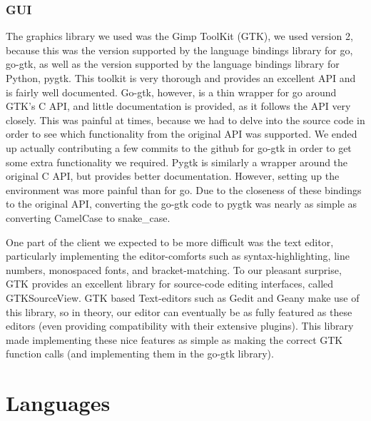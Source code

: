 \documentclass[12pt, letterpaper]{article}
\begin{document}
\subsubsection*{GUI}

The graphics library we used was the Gimp ToolKit (GTK), we used 
version 2, because this was the version supported by the language 
bindings library for go, go-gtk, as well as the version supported by 
the language bindings library for Python, pygtk. This toolkit is very 
thorough and provides an excellent API and is fairly well documented. 
Go-gtk, however, is a thin wrapper for go around GTK's C API, and 
little documentation is provided, as it follows the API very closely. 
This was painful at times, because we had to delve into the source code 
in order to see which functionality from the original API was 
supported. We ended up actually contributing a few commits to the 
github for go-gtk in order to get some extra functionality we required. 
Pygtk is similarly a wrapper around the original C API, but provides 
better documentation. However, setting up the environment was more 
painful than for go. Due to the closeness of these bindings to the 
original API, converting the go-gtk code to pygtk was nearly as simple 
as converting CamelCase to snake\_case.

One part of the client we expected to be more difficult was the text 
editor, particularly implementing the editor-comforts such as 
syntax-highlighting, line numbers, monospaced fonts, and 
bracket-matching. To our pleasant surprise, GTK provides an excellent 
library for source-code editing interfaces, called GTKSourceView. GTK 
based Text-editors such as Gedit and Geany make use of this library, so 
in theory, our editor can eventually be as fully featured as these 
editors (even providing compatibility with their extensive plugins). 
This library made implementing these nice features as simple as making 
the correct GTK function calls (and implementing them in the go-gtk 
library).

\section*{Languages}
\end{document}
